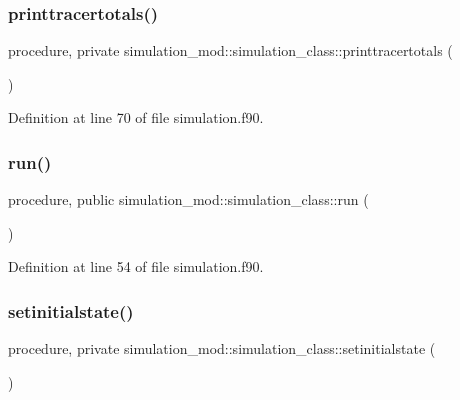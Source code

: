 \subsubsection{\texorpdfstring{printtracertotals()}{printtracertotals()}}
{\footnotesize\ttfamily procedure, private simulation\+\_\+mod\+::simulation\+\_\+class\+::printtracertotals (\begin{DoxyParamCaption}{ }\end{DoxyParamCaption})\hspace{0.3cm}{\ttfamily [private]}}



Definition at line 70 of file simulation.\+f90.

\mbox{\label{structsimulation__mod_1_1simulation__class_a47c2f9dd8a012a523ac88aa8d3c6a911}} 
\subsubsection{\texorpdfstring{run()}{run()}}
{\footnotesize\ttfamily procedure, public simulation\+\_\+mod\+::simulation\+\_\+class\+::run (\begin{DoxyParamCaption}{ }\end{DoxyParamCaption})}



Definition at line 54 of file simulation.\+f90.

\mbox{\label{structsimulation__mod_1_1simulation__class_aeb84b150c76e399c3dc33fbc3f7874ae}} 
\subsubsection{\texorpdfstring{setinitialstate()}{setinitialstate()}}
{\footnotesize\ttfamily procedure, private simulation\+\_\+mod\+::simulation\+\_\+class\+::setinitialstate (\begin{DoxyParamCaption}{ }\end{DoxyParamCaption})\hspace{0.3cm}{\ttfamily [private]}}



